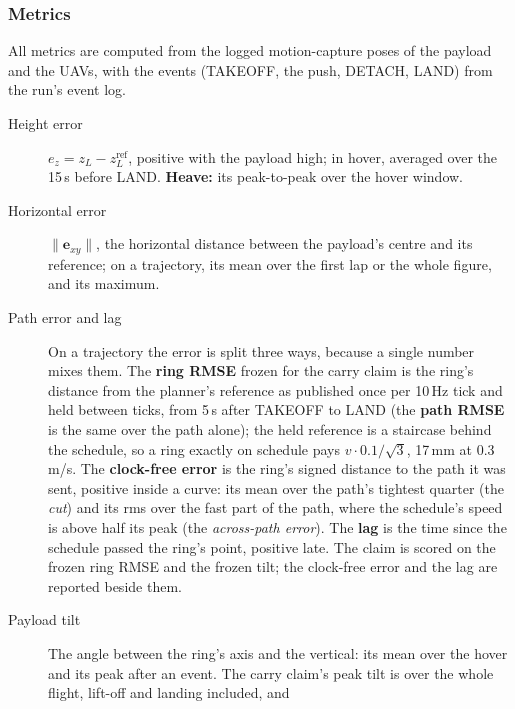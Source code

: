 
\subsubsection{Metrics}
\label{sec:metrics}

All metrics are computed from the logged motion-capture poses of the payload and the UAVs, with the
events (TAKEOFF, the push, DETACH, LAND) from the run's event log.
\begin{description}
    \item[Height error] $e_z = z_L - z_L^{\mathrm{ref}}$, positive with the payload high; in hover, averaged
    over the 15\,s before LAND. \textbf{Heave:} its peak-to-peak over the hover window.
    \item[Horizontal error] $\|\mathbf{e}_{xy}\|$, the horizontal distance between the payload's centre and
    its reference; on a trajectory, its mean over the first lap or the whole figure, and its maximum.
    \item[Path error and lag] On a trajectory the error is split three ways, because a single number mixes
    them. The \textbf{ring RMSE} frozen for the carry claim is the ring's distance from the planner's reference as
    published once per 10\,Hz tick and held between ticks, from 5\,s after TAKEOFF to LAND (the \textbf{path RMSE} is
    the same over the path alone); the held reference is a
    staircase behind the schedule, so a ring exactly on schedule pays $v \cdot 0.1/\sqrt{3}$, 17\,mm at
    0.3\,m/s. The \textbf{clock-free error} is the ring's signed distance to the path it was sent, positive inside
    a curve: its mean over the path's tightest quarter (the \emph{cut}) and its rms over the fast part of the path,
    where the schedule's speed is above half its peak (the \emph{across-path error}). The \textbf{lag} is the time
    since the schedule passed the ring's point, positive late. The claim is scored on the frozen ring RMSE and the frozen
    tilt; the clock-free error and the lag are reported beside them.
    \item[Payload tilt] The angle between the ring's axis and the vertical: its mean over the hover and its
    peak after an event. The carry claim's peak tilt is over the whole flight, lift-off and landing included, and

\end{description}
